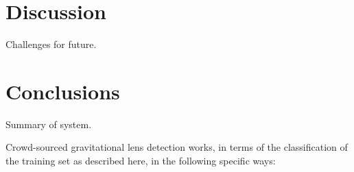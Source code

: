 \documentclass[useAMS,usenatbib,a4paper]{mn2e}
\begin{document}

\section{Discussion}
\label{sec:discuss}

Challenges for future.


\section{Conclusions}
\label{sec:conclude}

Summary of system.

Crowd-sourced gravitational lens detection works, in terms of the
classification of the training set as described here, in the following
specific ways: 
\end{document}
